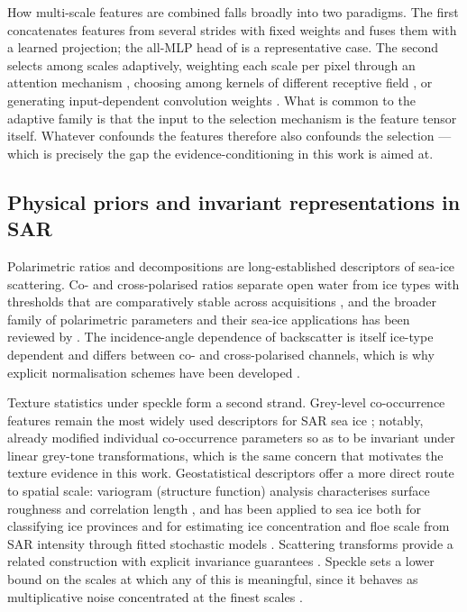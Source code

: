 \documentclass[preprint,12pt,authoryear]{elsarticle}
\begin{document}
How multi-scale features are combined falls broadly into two paradigms. The
first concatenates features from several strides with fixed weights and fuses
them with a learned projection; the all-MLP head of \citet{xie2021segformer} is
a representative case. The second selects among scales adaptively, weighting
each scale per pixel through an attention mechanism
\citep{chen2016attentiontoscale}, choosing among kernels of different receptive
field \citep{li2019sknet}, or generating input-dependent convolution weights
\citep{chen2020dynamicconv}. What is common to the adaptive family is that the
input to the selection mechanism is the feature tensor itself. Whatever
confounds the features therefore also confounds the selection --- which is
precisely the gap the evidence-conditioning in this work is aimed at.

\subsection{Physical priors and invariant representations in SAR}

Polarimetric ratios and decompositions are long-established descriptors of
sea-ice scattering. Co- and cross-polarised ratios separate open water from ice
types with thresholds that are comparatively stable across acquisitions
\citep{geldsetzer2009seaice}, and the broader family of polarimetric parameters
and their sea-ice applications has been reviewed by \citet{shokr2023polarimetric}.
The incidence-angle dependence of backscatter is itself ice-type dependent and
differs between co- and cross-polarised channels, which is why explicit
normalisation schemes have been developed \citep{aldenhoff2020incidence}.

Texture statistics under speckle form a second strand. Grey-level co-occurrence
features \citep{haralick1973textural} remain the most widely used descriptors for
SAR sea ice \citep{clausi2001comparison}; notably, \citet{shokr1991evaluation}
already modified individual co-occurrence parameters so as to be invariant under
linear grey-tone transformations, which is the same concern that motivates the
texture evidence in this work. Geostatistical descriptors offer a more direct
route to spatial scale: variogram (structure function) analysis characterises
surface roughness and correlation length \citep{garrigues2007variograms}, and has
been applied to sea ice both for classifying ice provinces
\citep{herzfeld2016geostatistical} and for estimating ice concentration and floe
scale from SAR intensity through fitted stochastic models
\citep{wang2016variograms}. Scattering transforms provide a related construction
with explicit invariance guarantees \citep{bruna2013scattering}. Speckle sets a
lower bound on the scales at which any of this is meaningful, since it behaves as
multiplicative noise concentrated at the finest scales
\citep{lee1981speckle,lee1981refined,argenti2013tutorial}.
\end{document}
